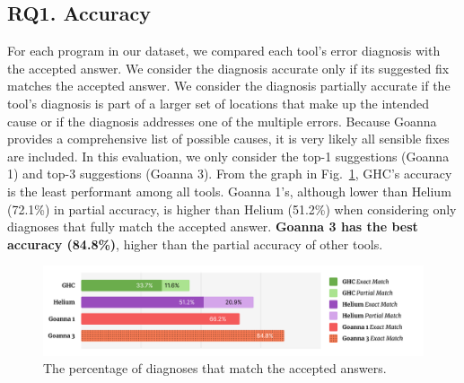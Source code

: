     


 	\subsection{RQ1. Accuracy}\label{sub:eval-accuracy}
 	For each program in our dataset, we compared each tool's error diagnosis with the accepted answer. We consider the diagnosis accurate only if its suggested fix matches the accepted answer. We consider the diagnosis partially accurate if the tool's diagnosis is part of a larger set of locations that make up the intended cause or if the diagnosis addresses one of the multiple errors. Because Goanna provides a comprehensive list of possible causes, it is very likely all sensible fixes are included. In this evaluation, we only consider the top-1 suggestions (Goanna 1) and top-3 suggestions (Goanna 3).  From the graph in Fig.~\ref{fig:accuracy}, GHC's accuracy is the least performant among all tools. Goanna 1's, although lower than Helium (72.1\%) in partial accuracy, is higher than Helium (51.2\%) when considering only diagnoses that fully match the accepted answer. \textbf{Goanna 3 has the best accuracy (84.8\%)}, higher than the partial accuracy of other tools.
  
     \begin{figure}[ht!]
        \centering
        \includegraphics[width=\linewidth]{images/Accuracy}
        \caption{The percentage of diagnoses that match the accepted answers.} 
        \label{fig:accuracy}
    \end{figure}


 	


